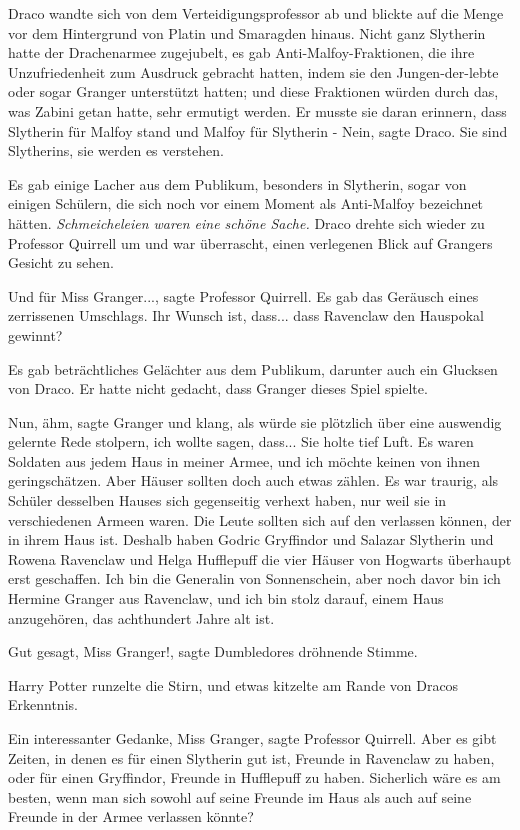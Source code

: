 Draco wandte sich von dem Verteidigungsprofessor ab und blickte auf die Menge
vor dem Hintergrund von Platin und Smaragden hinaus. Nicht ganz Slytherin hatte
der Drachenarmee zugejubelt, es gab Anti-Malfoy-Fraktionen, die ihre
Unzufriedenheit zum Ausdruck gebracht hatten, indem sie den Jungen-der-lebte
oder sogar Granger unterstützt hatten; und diese Fraktionen würden durch das,
was Zabini getan hatte, sehr ermutigt werden. Er musste sie daran erinnern, dass
Slytherin für Malfoy stand und Malfoy für Slytherin - \glqq{}Nein\grqq{}, sagte
Draco. \glqq{}Sie sind Slytherins, sie werden es verstehen.\grqq{}

Es gab einige Lacher aus dem Publikum, besonders in Slytherin, sogar von einigen
Schülern, die sich noch vor einem Moment als Anti-Malfoy bezeichnet hätten.
\emph{Schmeicheleien waren eine schöne Sache.} Draco drehte sich wieder zu
Professor Quirrell um und war überrascht, einen verlegenen Blick auf Grangers
Gesicht zu sehen.

\glqq{}Und für Miss Granger...\grqq{}, sagte Professor Quirrell. Es gab das
Geräusch eines zerrissenen Umschlags. \glqq{}Ihr Wunsch ist, dass... dass
Ravenclaw den Hauspokal gewinnt?\grqq{}

Es gab beträchtliches Gelächter aus dem Publikum, darunter auch ein Glucksen von
Draco. Er hatte nicht gedacht, dass Granger dieses Spiel spielte.

\glqq{}Nun, ähm\grqq{}, sagte Granger und klang, als würde sie plötzlich über
eine auswendig gelernte Rede stolpern, \glqq{}ich wollte sagen, dass...\grqq{} Sie
holte tief Luft. \glqq{}Es waren Soldaten aus jedem Haus in meiner Armee, und ich
möchte keinen von ihnen geringschätzen. Aber Häuser sollten doch auch etwas
zählen. Es war traurig, als Schüler desselben Hauses sich gegenseitig verhext
haben, nur weil sie in verschiedenen Armeen waren. Die Leute sollten sich auf
den verlassen können, der in ihrem Haus ist. Deshalb haben Godric Gryffindor und
Salazar Slytherin und Rowena Ravenclaw und Helga Hufflepuff die vier Häuser von
Hogwarts überhaupt erst geschaffen. Ich bin die Generalin von Sonnenschein, aber
noch davor bin ich Hermine Granger aus Ravenclaw, und ich bin stolz darauf,
einem Haus anzugehören, das achthundert Jahre alt ist.\grqq{}

\glqq{}Gut gesagt, Miss Granger!\grqq{}, sagte Dumbledores dröhnende Stimme.

Harry Potter runzelte die Stirn, und etwas kitzelte am Rande von Dracos
Erkenntnis.

\glqq{}Ein interessanter Gedanke, Miss Granger\grqq{}, sagte Professor Quirrell.
\glqq{}Aber es gibt Zeiten, in denen es für einen Slytherin gut ist, Freunde in
Ravenclaw zu haben, oder für einen Gryffindor, Freunde in Hufflepuff zu haben.
Sicherlich wäre es am besten, wenn man sich sowohl auf seine Freunde im Haus als
auch auf seine Freunde in der Armee verlassen könnte?\grqq{}

